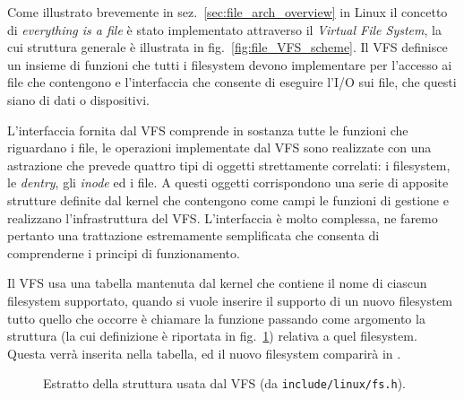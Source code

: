 

Come illustrato brevemente in sez.~\ref{sec:file_arch_overview} in Linux il
concetto di \textit{everything is a file} è stato implementato attraverso il
\textit{Virtual File System}, la cui struttura generale è illustrata in
fig.~\ref{fig:file_VFS_scheme}.  Il VFS definisce un insieme di funzioni che
tutti i filesystem devono implementare per l'accesso ai file che contengono e
l'interfaccia che consente di eseguire l'I/O sui file, che questi siano di
dati o dispositivi. 


L'interfaccia fornita dal VFS comprende in sostanza tutte le funzioni che
riguardano i file, le operazioni implementate dal VFS sono realizzate con una
astrazione che prevede quattro tipi di oggetti strettamente correlati: i
filesystem, le \textit{dentry}, gli \textit{inode} ed i file. A questi oggetti
corrispondono una serie di apposite strutture definite dal kernel che
contengono come campi le funzioni di gestione e realizzano l'infrastruttura
del VFS. L'interfaccia è molto complessa, ne faremo pertanto una trattazione
estremamente semplificata che consenta di comprenderne i principi
di funzionamento.

Il VFS usa una tabella mantenuta dal kernel che contiene il nome di ciascun
filesystem supportato, quando si vuole inserire il supporto di un nuovo
filesystem tutto quello che occorre è chiamare la funzione
 passando come argomento la struttura
 (la cui definizione è riportata in
fig.~\ref{fig:kstruct_file_system_type}) relativa a quel filesystem. Questa
verrà inserita nella tabella, ed il nuovo filesystem comparirà in
.

\begin{figure}[!htb]
  \footnotesize \centering
  \begin{minipage}[c]{0.80\textwidth}
  \end{minipage}
  \normalsize 
  \caption{Estratto della struttura  usata dal
    VFS (da \texttt{include/linux/fs.h}).}
  \label{fig:kstruct_file_system_type}
\end{figure}

